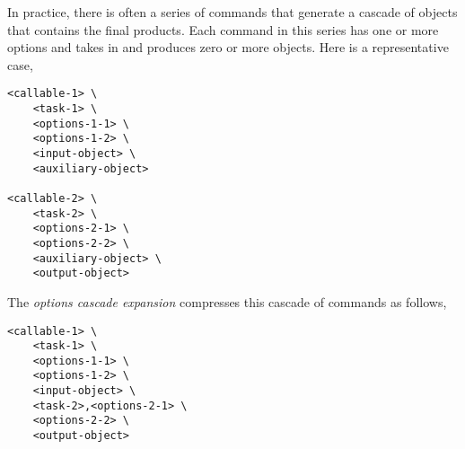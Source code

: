 In practice, there is often a series of commands that generate a cascade of objects that contains the final products. Each command in this series has one or more options and takes in and produces zero or more objects. Here is a representative case,
%
\begin{verbatim}
<callable-1> \
    <task-1> \
    <options-1-1> \
    <options-1-2> \
    <input-object> \
    <auxiliary-object>

<callable-2> \
    <task-2> \
    <options-2-1> \
    <options-2-2> \
    <auxiliary-object> \
    <output-object>
\end{verbatim}
%
The \emph{options cascade expansion} compresses this cascade of commands as follows,
%
\begin{verbatim}
<callable-1> \
    <task-1> \
    <options-1-1> \
    <options-1-2> \
    <input-object> \
    <task-2>,<options-2-1> \
    <options-2-2> \
    <output-object>
\end{verbatim}